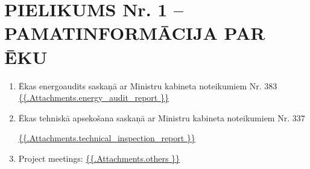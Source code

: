 \section{PIELIKUMS Nr. 1 – PAMATINFORMĀCIJA PAR ĒKU}

\begin{enumerate}[label=\arabic*.]
	\item Ēkas energoaudits saskaņā ar Ministru kabineta noteikumiem Nr. 383
\url{ {{.Attachments.energy_audit_report }} }

\iffalse attachment value="energy audit report" \fi

	\item Ēkas tehniskā apsekošana saskaņā ar Ministru kabineta noteikumiem Nr. 337

\url{ {{.Attachments.technical_inspection_report }} }

\iffalse attachment value="technical inspection report" \fi

	\item Project meetings:
          \url{ {{.Attachments.others }} }
          \iffalse attachment value="others" \fi


\end{enumerate}
